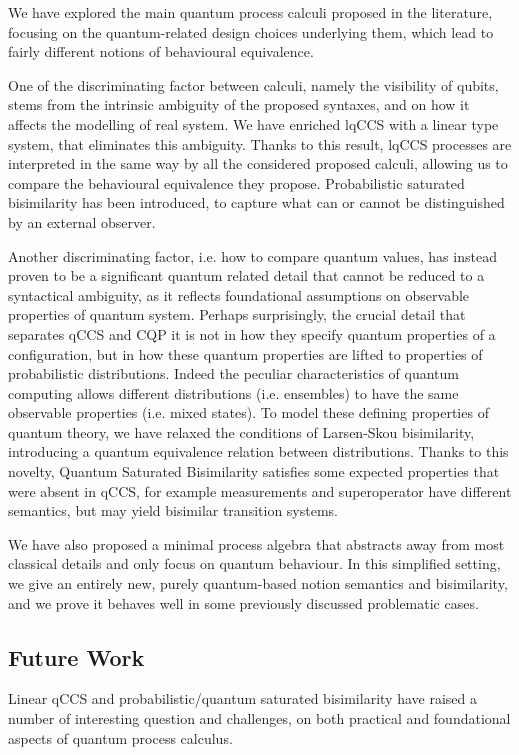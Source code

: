 We have explored the main  quantum process calculi proposed in the literature, focusing on the quantum-related design choices underlying them, which lead to fairly different notions of behavioural equivalence.

One of the discriminating factor between calculi, namely the visibility of qubits, stems from the intrinsic ambiguity of the proposed syntaxes, and on how it affects the modelling of real system. We have enriched lqCCS with a linear type system, that eliminates this ambiguity. Thanks to this result, lqCCS processes are interpreted in the same way by all the considered proposed calculi, allowing us to compare the behavioural equivalence they propose. Probabilistic saturated bisimilarity has been introduced, to capture what can or cannot be distinguished by an external observer.

Another discriminating factor, i.e. how to compare quantum values, has instead proven to be a significant quantum related detail that cannot be reduced to a syntactical ambiguity, as it reflects foundational assumptions on observable properties of quantum system. Perhaps surprisingly, the crucial detail that separates qCCS and CQP it is not in how they specify quantum properties of a configuration, but in how these quantum properties are lifted to properties of probabilistic distributions. Indeed the peculiar characteristics of quantum computing allows different distributions (i.e. ensembles) to have the same observable properties (i.e. mixed states). To model these defining properties of quantum theory, we have relaxed the conditions of Larsen-Skou bisimilarity, introducing a quantum equivalence relation between distributions. Thanks to this novelty, Quantum Saturated Bisimilarity satisfies some expected properties that were absent in qCCS, for example measurements and superoperator have different semantics, but may yield bisimilar transition systems. 

We have also proposed a minimal process algebra that abstracts away from most classical details and only focus on quantum behaviour. In this simplified setting, we give an entirely new, purely quantum-based notion semantics and bisimilarity, and we prove it behaves well in some previously discussed problematic cases. 

\subsection*{Future Work}
Linear qCCS and probabilistic/quantum saturated bisimilarity have raised a number of interesting question and challenges, on both practical and foundational aspects of quantum process calculus.

